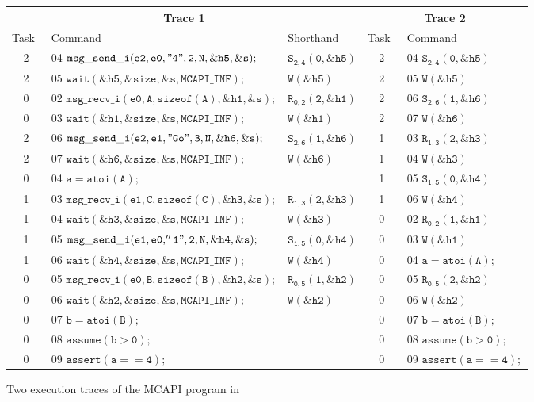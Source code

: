 \begin{figure*}
\begin{center}
\setlength{\tabcolsep}{2pt}
\scriptsize \begin{tabular}[t]{|c|l|l||c|l|}
\hline
\multicolumn{3}{|c||}{Trace 1} & \multicolumn{2}{|c|}{Trace 2}\\
\hline
Task\  & Command\ & Shorthand\ & Task\ & Command\  \\
\hline
2 & 04 $\mathtt{msg\_send\_i(e2,e0,"4",2,N,\&h5,\&s);}$ & $\mathtt{S_{2,4}(0,\&h5)}$ & 2 & 04 $\mathtt{S_{2,4}(0,\&h5)}$ \\
2 & 05 $\mathtt{wait(\&h5,\&size,\&s,MCAPI\_INF);}$ & $\mathtt{W(\&h5)}$ & 2 & 05 $\mathtt{W(\&h5)}$ \\
0 & 02 $\mathtt{msg\_recv\_i(e0,A,sizeof(A),\&h1,\&s);}$ & $\mathtt{R_{0,2}(2,\&h1)}$ & 2 & 06 $\mathtt{S_{2,6}(1,\&h6)}$ \\
0 & 03 $\mathtt{wait(\&h1,\&size,\&s,MCAPI\_INF);}$ & $\mathtt{W(\&h1)}$ & 2 & 07 $\mathtt{W(\&h6)}$ \\
2 & 06 $\mathtt{msg\_send\_i(e2,e1,"Go",3,N,\&h6,\&s);}$ & $\mathtt{S_{2,6}(1,\&h6)}$ & 1 & 03 $\mathtt{R_{1,3}(2,\&h3)}$ \\
2 & 07 $\mathtt{wait(\&h6,\&size,\&s,MCAPI\_INF);}$ & $\mathtt{W(\&h6)}$ & 1 & 04 $\mathtt{W(\&h3)}$ \\
0 & 04 $\mathtt{a = atoi(A);}$ & & 1 & 05 $\mathtt{S_{1,5}(0,\&h4)}$ \\
1 & 03 $\mathtt{msg\_recv\_i(e1,C,sizeof(C),\&h3,\&s);}$ & $\mathtt{R_{1,3}(2,\&h3)}$ & 1 & 06 $\mathtt{W(\&h4)}$ \\
1 & 04 $\mathtt{wait(\&h3,\&size,\&s,MCAPI\_INF);}$ & $\mathtt{W(\&h3)}$ & 0 & 02 $\mathtt{R_{0,2}(1,\&h1)}$ \\
1 & 05 $\mathtt{msg\_send\_i(e1,e0,''1",2,N,\&h4,\&s);}$ & $\mathtt{S_{1,5}(0,\&h4)}$ & 0 & 03 $\mathtt{W(\&h1)}$ \\
1 & 06 $\mathtt{wait(\&h4,\&size,\&s,MCAPI\_INF);}$ & $\mathtt{W(\&h4)}$ & 0 & 04 $\mathtt{a = atoi(A);}$ \\
0 & 05 $\mathtt{msg\_recv\_i(e0,B,sizeof(B),\&h2,\&s);}$ & $\mathtt{R_{0,5}(1,\&h2)}$ & 0 & 05 $\mathtt{R_{0,5}(2,\&h2)}$\\
0 & 06 $\mathtt{wait(\&h2,\&size,\&s,MCAPI\_INF);}$ & $\mathtt{W(\&h2)}$ & 0 & 06 $\mathtt{W(\&h2)}$ \\
0 & 07 $\mathtt{b = atoi(B);}$ & & 0 & 07 $\mathtt{b = atoi(B);}$ \\
0 & 08 $\mathtt{assume (b > 0);}$ & & 0 & 08 $\mathtt{assume (b > 0);}$ \\
0 & 09 $\mathtt{assert(a == 4);}$ & & 0 & 09 $\mathtt{assert(a == 4);}$ \\
\hline
\end{tabular}
\end{center}
\caption{Two execution traces of the MCAPI program in }
\label{fig:trace}
\end{figure*}

